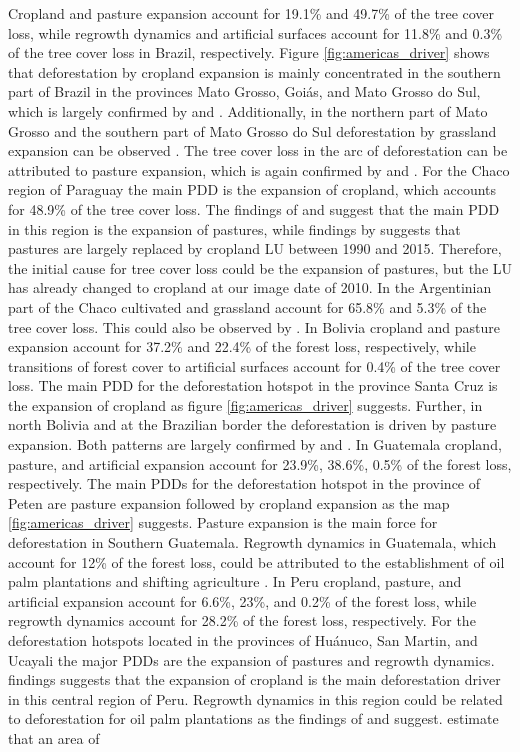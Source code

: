 Cropland and pasture expansion account for 19.1\% and 49.7\% of the tree cover loss, while regrowth dynamics and artificial surfaces account for 11.8\% and 0.3\% of the tree cover loss in Brazil, respectively. Figure \ref{fig:americas_driver} shows that deforestation by cropland expansion is mainly concentrated in the southern part of Brazil in the provinces Mato Grosso, Goi\'{a}s, and Mato Grosso do Sul, which is largely confirmed by \citet{Zalles2018} and \citet{Graesser2015}. Additionally, in the northern part of Mato Grosso and the southern part of Mato Grosso do Sul deforestation by grassland expansion can be observed \citep{Graesser2015,Sy2015}. The tree cover loss in the arc of deforestation can be attributed to pasture expansion, which is again confirmed by \citet{Sy2015} and \citet{Graesser2015}. For the Chaco region of Paraguay the main \ac{PDD} is the expansion of cropland, which accounts for 48.9\% of the tree cover loss. The findings of \citet{Graesser2015} and \citet{Caldas2013} suggest that the main \ac{PDD} in this region is the expansion of pastures, while findings by \citet{Graesser2018} suggests that pastures are largely replaced by cropland \ac{LU} between 1990 and 2015. Therefore, the initial cause for tree cover loss could be the expansion of pastures, but the \ac{LU} has already changed to cropland at our image date of 2010. In the Argentinian part of the Chaco cultivated and grassland account for 65.8\% and 5.3\% of the tree cover loss. This could also be observed by \citet{Sy2015}. In Bolivia cropland and pasture expansion account for 37.2\% and 22.4\% of the forest loss, respectively, while transitions of forest cover to artificial surfaces account for 0.4\% of the tree cover loss. The main \ac{PDD} for the deforestation hotspot in the province Santa Cruz is the expansion of cropland as figure \ref{fig:americas_driver} suggests. Further, in north Bolivia and at the Brazilian border the deforestation is driven by pasture expansion. Both patterns are largely confirmed by \citet{Graesser2015} and \citet{Sy2015}. In Guatemala cropland, pasture, and artificial expansion account for 23.9\%, 38.6\%, 0.5\% of the forest loss, respectively. The main \acp{PDD} for the deforestation hotspot in the province of Peten are pasture expansion followed by cropland expansion as the map \ref{fig:americas_driver} suggests. Pasture expansion is the main force for deforestation in Southern Guatemala. Regrowth dynamics in Guatemala, which account for 12\% of the forest loss, could be attributed to the establishment of oil palm plantations and shifting agriculture \citep{Furumo2017,Curtis2018}. In Peru cropland, pasture, and artificial expansion account for 6.6\%, 23\%, and 0.2\% of the forest loss, while regrowth dynamics account for 28.2\% of the forest loss, respectively. For the deforestation hotspots located in the provinces of Huánuco, San Martin, and Ucayali the major \acp{PDD} are the expansion of pastures and regrowth dynamics. \citet{Sy2015} findings suggests that the expansion of cropland is the main deforestation driver in this central region of Peru. Regrowth dynamics in this region could be related to deforestation for oil palm plantations as the findings of \citet{Vijay2018} and \citet{Furumo2017} suggest. \citet{Vijay2018} estimate that an area of 